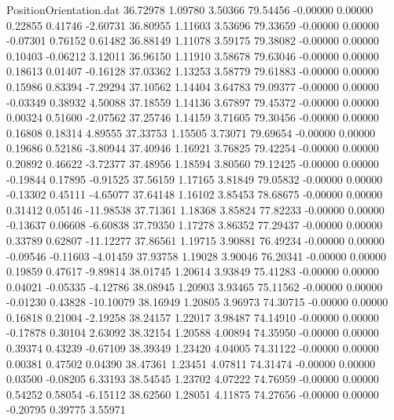 \begin{filecontents}{PositionOrientation.dat}
  36.72978    1.09780    3.50366    79.54456   -0.00000    0.00000    0.22855    0.41746   -2.60731
  36.80955    1.11603    3.53696    79.33659   -0.00000    0.00000   -0.07301    0.76152    0.61482
  36.88149    1.11078    3.59175    79.38082   -0.00000    0.00000    0.10403   -0.06212    3.12011
  36.96150    1.11910    3.58678    79.63046   -0.00000    0.00000    0.18613    0.01407   -0.16128
  37.03362    1.13253    3.58779    79.61883   -0.00000    0.00000    0.15986    0.83394   -7.29294
  37.10562    1.14404    3.64783    79.09377   -0.00000    0.00000   -0.03349    0.38932    4.50088
  37.18559    1.14136    3.67897    79.45372   -0.00000    0.00000    0.00324    0.51600   -2.07562
  37.25746    1.14159    3.71605    79.30456   -0.00000    0.00000    0.16808    0.18314    4.89555
  37.33753    1.15505    3.73071    79.69654   -0.00000    0.00000    0.19686    0.52186   -3.80944
  37.40946    1.16921    3.76825    79.42254   -0.00000    0.00000    0.20892    0.46622   -3.72377
  37.48956    1.18594    3.80560    79.12425   -0.00000    0.00000   -0.19844    0.17895   -0.91525
  37.56159    1.17165    3.81849    79.05832   -0.00000    0.00000   -0.13302    0.45111   -4.65077
  37.64148    1.16102    3.85453    78.68675   -0.00000    0.00000    0.31412    0.05146  -11.98538
  37.71361    1.18368    3.85824    77.82233   -0.00000    0.00000   -0.13637    0.06608   -6.60838
  37.79350    1.17278    3.86352    77.29437   -0.00000    0.00000    0.33789    0.62807  -11.12277
  37.86561    1.19715    3.90881    76.49234   -0.00000    0.00000   -0.09546   -0.11603   -4.01459
  37.93758    1.19028    3.90046    76.20341   -0.00000    0.00000    0.19859    0.47617   -9.89814
  38.01745    1.20614    3.93849    75.41283   -0.00000    0.00000    0.04021   -0.05335   -4.12786
  38.08945    1.20903    3.93465    75.11562   -0.00000    0.00000   -0.01230    0.43828  -10.10079
  38.16949    1.20805    3.96973    74.30715   -0.00000    0.00000    0.16818    0.21004   -2.19258
  38.24157    1.22017    3.98487    74.14910   -0.00000    0.00000   -0.17878    0.30104    2.63092
  38.32154    1.20588    4.00894    74.35950   -0.00000    0.00000    0.39374    0.43239   -0.67109
  38.39349    1.23420    4.04005    74.31122   -0.00000    0.00000    0.00381    0.47502    0.04390
  38.47361    1.23451    4.07811    74.31474   -0.00000    0.00000    0.03500   -0.08205    6.33193
  38.54545    1.23702    4.07222    74.76959   -0.00000    0.00000    0.54252    0.58054   -6.15112
  38.62560    1.28051    4.11875    74.27656   -0.00000    0.00000   -0.20795    0.39775    3.55971

\end{filecontents}
